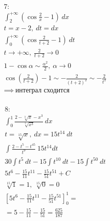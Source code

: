 \begin{multline}
    \text{7:}\\
    \int_{2}^{+\infty} (\cos{\frac{2}{x}} - 1)\ dx\\
    t = x - 2,\ dt = dx\\
    \int_{0}^{+\infty} (\cos{\frac{2}{t + 2}} - 1)\ dt\\
    t \to +\infty,\ \frac{2}{t + 2} \to 0\\
    1 - \cos{\alpha} \sim \frac{\alpha^2}{2},\ \alpha \to 0\\
    \cos{(\frac{2}{t + 2})} - 1 \sim -\frac{2}{(t + 2)^2} \sim -\frac{2}{t^2}\\
    \implies\ \text{интеграл сходится}\\
\end{multline}



\begin{multline}
    \text{8:}\\
    \int_{0}^{1} \frac{2 - \sqrt[3]{x} - x^3}{\sqrt[5]{x^3}}\ dx\\
    t = \sqrt[15]{x},\ dx = 15t^{14}\ dt\\
    \int \frac{2 - t^{5} - t^{45}}{t^{9}}\ 15t^{14} dt\\
    30 \int t^{5}\ dt - 15 \int t^{10}\ dt - 15 \int t^{50}\ dt\\
    5t^6 - \frac{15}{11} t^{11} - \frac{15}{51} t^{51} + C\\
    \sqrt[15]{1} = 1,\ \sqrt[15]{0} = 0\\
    [5t^6 - \frac{15}{11} t^{11} - \frac{15}{51} t^{51}]_{0}^{1} =\\
    = 5 - \frac{15}{11} - \frac{15}{51} = \frac{625}{187}\\
\end{multline}


